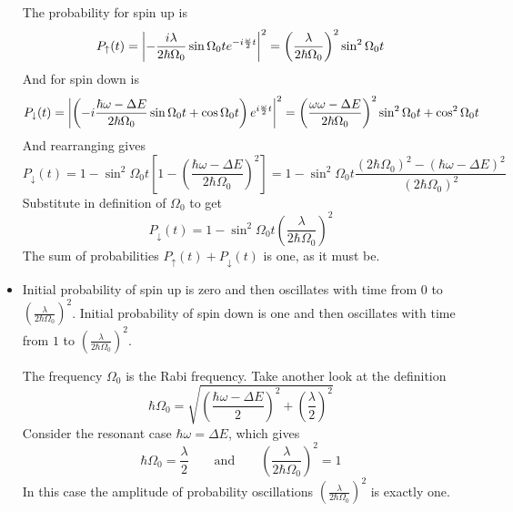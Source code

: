\documentclass[11pt, a4paper]{article}
\newcommand{\eqtext}[1]{\qquad \text{#1} \qquad}
\newcommand{\ua}{\uparrow}  %
\newcommand{\da}{\downarrow}  %
\begin{document}
\begin{itemize}
	The probability for spin up is
	\begin{equation*}
		P_{\ua}(t) = \abs{-\frac{i\lambda}{2\hbar \Omega_{0}} \sin \Omega_{0}t e^{-i\frac{\omega}{2}t}}^{2} = \left(\frac{\lambda}{2\hbar\Omega_{0}}\right)^{2}\sin^{2}\Omega_{0}t
	\end{equation*}
	And for spin down is
	\begin{equation*}
		P_{\da}(t) = \abs{\left(-i\frac{\hbar \omega - \Delta E}{2\hbar\Omega_{0}} \sin \Omega_{0}t + \cos \Omega_{0}t\right)e^{i\frac{\omega}{2}t} }^{2} = \left(\frac{\omega \omega - \Delta E}{2\hbar \Omega_{0}}\right)^{2}\sin^{2}\Omega_{0}t + \cos^{2}\Omega_{0}t
	\end{equation*}
	And rearranging gives
	\begin{equation*}
		P_{\da}(t) = 1 - \sin^{2}\Omega_{0}t\left[1 - \left(\frac{\hbar \omega - \Delta E}{2\hbar \Omega_{0}}\right)^{2}\right] = 1 - \sin^{2}\Omega_{0}t\frac{(2\hbar \Omega_{0})^{2} - (\hbar \omega - \Delta E)^{2}}{(2\hbar \Omega_{0})^{2}}
	\end{equation*}
	Substitute in definition of $ \Omega_{0} $ to get
	\begin{equation*}
		P_{\da}(t) = 1 - \sin^{2}\Omega_{0}t\left(\frac{\lambda}{2\hbar \Omega_{0}}\right)^{2}
	\end{equation*}
	The sum of probabilities $ P_{\ua}(t) + P_{\da}(t) $ is one, as it must be.
	
	\item Initial probability of spin up is zero and then oscillates with time from $ 0 $ to $ \left(\frac{\lambda}{2\hbar \Omega_{0}}\right)^{2} $. Initial probability of spin down is one and then oscillates with time from $ 1 $ to $ \left(\frac{\lambda}{2\hbar \Omega_{0}}\right)^{2} $.
	
	The frequency $ \Omega_{0} $ is the Rabi frequency. Take another look at the definition
	\begin{equation*}
		\hbar \Omega_{0} = \sqrt{\left(\frac{\hbar \omega - \Delta E}{2}\right)^{2} + \left(\frac{\lambda}{2}\right)^{2}}
	\end{equation*}
	Consider the resonant case $ \hbar \omega = \Delta E $, which gives
	\begin{equation*}
		\hbar \Omega_{0} = \frac{\lambda}{2} \eqtext{and} \left(\frac{\lambda}{2\hbar \Omega_{0}}\right)^{2} = 1
	\end{equation*}
	In this case the amplitude of probability oscillations $ \left(\frac{\lambda}{2\hbar \Omega_{0}}\right)^{2} $ is exactly one.
	

\end{itemize}
\end{document}

